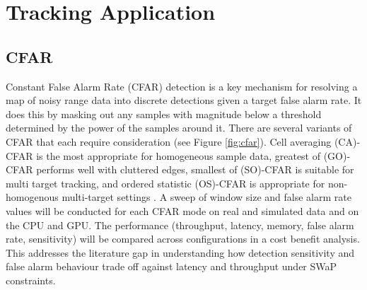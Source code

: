 \section{Tracking Application}
\label{sec:tracking_app}

\subsection{CFAR}
Constant False Alarm Rate (CFAR) detection is a key mechanism for resolving a map of noisy range data into discrete detections given a target false alarm rate. It does this by masking out any samples with magnitude below a threshold determined by the power of the samples around it. There are several variants of CFAR that each require consideration (see Figure \ref{fig:cfar}). Cell averaging (CA)-CFAR is the most appropriate for homogeneous sample data, greatest of (GO)-CFAR performs well with cluttered edges, smallest of (SO)-CFAR is suitable for multi target tracking, and ordered statistic (OS)-CFAR is appropriate for non-homogenous multi-target settings \cite{18645}. A sweep of window size and false alarm rate values will be conducted for each CFAR mode on real and simulated data and on the CPU and GPU. The performance (throughput, latency, memory, false alarm rate, sensitivity) will be compared across configurations in a cost benefit analysis. This addresses the literature gap in understanding how detection sensitivity and false alarm behaviour trade off against latency and throughput under SWaP constraints.

